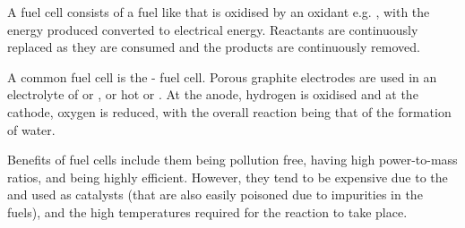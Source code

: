 \documentclass[Chemistry.tex]{subfiles}
\begin{document}
A fuel cell consists of a fuel like  that is oxidised by an oxidant e.g. , with the energy produced converted to electrical energy. Reactants are continuously replaced as they are consumed and the products are continuously removed.

A common fuel cell is the - fuel cell. Porous graphite electrodes are used in an electrolyte of  or , or hot  or . At the anode, hydrogen is oxidised and at the cathode, oxygen is reduced, with the overall reaction being that of the formation of water.

Benefits of fuel cells include them being pollution free, having high power-to-mass ratios, and being highly efficient. However, they tend to be expensive due to the  and  used as catalysts (that are also easily poisoned due to impurities in the fuels), and the high temperatures required for the reaction to take place.
\end{document}
